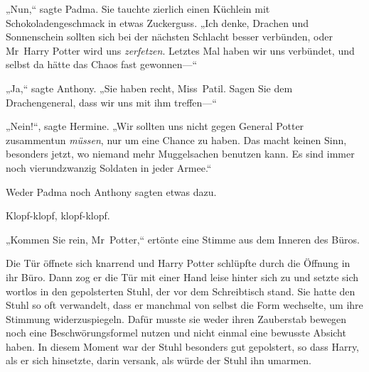 „Nun,“ sagte Padma. Sie tauchte zierlich einen Küchlein mit Schokoladengeschmack in etwas Zuckerguss. „Ich denke, Drachen und Sonnenschein sollten sich bei der nächsten Schlacht besser verbünden, oder Mr~Harry Potter wird uns \emph{zerfetzen}. Letztes Mal haben wir uns verbündet, und selbst da hätte das Chaos fast gewonnen—“

„Ja,“ sagte Anthony. „Sie haben recht, Miss~Patil. Sagen Sie dem Drachengeneral, dass wir uns mit ihm treffen—“

„Nein!“, sagte Hermine. „Wir sollten uns nicht gegen General Potter zusammentun \emph{müssen}, nur um eine Chance zu haben. Das macht keinen Sinn, besonders jetzt, wo niemand mehr Muggelsachen benutzen kann. Es sind immer noch vierundzwanzig Soldaten in jeder Armee.“

Weder Padma noch Anthony sagten etwas dazu.

\later

Klopf-klopf, klopf-klopf.

„Kommen Sie rein, Mr~Potter,“ ertönte eine Stimme aus dem Inneren des Büros.

Die Tür öffnete sich knarrend und Harry Potter schlüpfte durch die Öffnung in ihr Büro. Dann zog er die Tür mit einer Hand leise hinter sich zu und setzte sich wortlos in den gepolsterten Stuhl, der vor dem Schreibtisch stand. Sie hatte den Stuhl so oft verwandelt, dass er manchmal von selbst die Form wechselte, um ihre Stimmung widerzuspiegeln. Dafür musste sie weder ihren Zauberstab bewegen noch eine Beschwörungsformel nutzen und nicht einmal eine bewusste Absicht haben.
In diesem Moment war der Stuhl besonders gut gepolstert, so dass Harry, als er sich hinsetzte, darin versank, als würde der Stuhl ihn umarmen.

